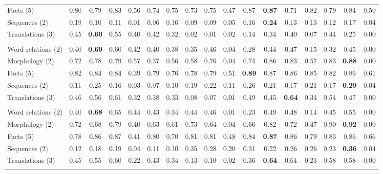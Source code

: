 \begin{tabular}{@{}lcccccccccccccccc@{}}
\quad Facts (5) & 0.80 & 0.79 & 0.83 & 0.56 & 0.74 & 0.75 & 0.73 & 0.75 & 0.47 & 0.87 & \textbf{0.87} & 0.71 & 0.82 & 0.79 & 0.84 & 0.50 \\
\quad Sequences (2) & 0.19 & 0.10 & 0.11 & 0.01 & 0.06 & 0.16 & 0.09 & 0.09 & 0.05 & 0.16 & \textbf{0.24} & 0.13 & 0.13 & 0.12 & 0.17 & 0.04 \\
\quad Translations (3) & 0.45 & \textbf{0.60} & 0.55 & 0.40 & 0.42 & 0.32 & 0.02 & 0.01 & 0.02 & 0.14 & 0.34 & 0.40 & 0.07 & 0.44 & 0.25 & 0.00 \\
\addlinespace
\multicolumn{17}{@{}l}{\textit{60 heads}} \\
\quad Word relations (2) & 0.40 & \textbf{0.69} & 0.60 & 0.42 & 0.40 & 0.38 & 0.35 & 0.46 & 0.04 & 0.28 & 0.44 & 0.47 & 0.15 & 0.32 & 0.45 & 0.00 \\
\quad Morphology (2) & 0.72 & 0.78 & 0.79 & 0.57 & 0.37 & 0.56 & 0.58 & 0.76 & 0.04 & 0.74 & 0.86 & 0.83 & 0.57 & 0.83 & \textbf{0.88} & 0.00 \\
\quad Facts (5) & 0.82 & 0.84 & 0.84 & 0.39 & 0.79 & 0.76 & 0.78 & 0.79 & 0.51 & \textbf{0.89} & 0.87 & 0.86 & 0.85 & 0.82 & 0.86 & 0.61 \\
\quad Sequences (2) & 0.11 & 0.25 & 0.16 & 0.03 & 0.07 & 0.10 & 0.19 & 0.22 & 0.11 & 0.26 & 0.21 & 0.17 & 0.21 & 0.17 & \textbf{0.29} & 0.04 \\
\quad Translations (3) & 0.46 & 0.56 & 0.61 & 0.32 & 0.38 & 0.33 & 0.08 & 0.07 & 0.01 & 0.49 & 0.45 & \textbf{0.64} & 0.34 & 0.54 & 0.47 & 0.00 \\
\addlinespace
\multicolumn{17}{@{}l}{\textit{80 heads}} \\
\quad Word relations (2) & 0.40 & \textbf{0.68} & 0.65 & 0.44 & 0.43 & 0.34 & 0.44 & 0.46 & 0.01 & 0.23 & 0.49 & 0.48 & 0.14 & 0.45 & 0.55 & 0.00 \\
\quad Morphology (2) & 0.72 & 0.68 & 0.79 & 0.40 & 0.63 & 0.61 & 0.73 & 0.64 & 0.04 & 0.66 & 0.82 & 0.72 & 0.47 & 0.90 & \textbf{0.92} & 0.00 \\
\quad Facts (5) & 0.78 & 0.86 & 0.87 & 0.41 & 0.80 & 0.70 & 0.81 & 0.81 & 0.48 & 0.84 & \textbf{0.87} & 0.86 & 0.79 & 0.83 & 0.86 & 0.66 \\
\quad Sequences (2) & 0.12 & 0.18 & 0.19 & 0.04 & 0.11 & 0.10 & 0.35 & 0.28 & 0.20 & 0.31 & 0.22 & 0.26 & 0.26 & 0.23 & \textbf{0.36} & 0.04 \\
\quad Translations (3) & 0.45 & 0.55 & 0.60 & 0.22 & 0.43 & 0.34 & 0.13 & 0.10 & 0.02 & 0.36 & \textbf{0.64} & 0.64 & 0.23 & 0.58 & 0.58 & 0.00 \\
\addlinespace

\end{tabular}
